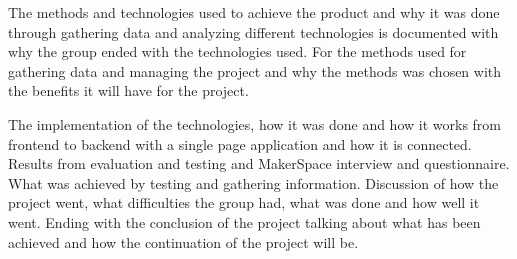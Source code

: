\documentclass[12pt]{report}
\begin{document}
The methods and technologies used to achieve the product and why it was done through gathering data and analyzing different technologies is documented with why the group ended with the technologies used. For the methods used for gathering data and managing the project and why the methods was chosen with the benefits it will have for the project.  

The implementation of the technologies, how it was done and how  it works from frontend to backend with a single page application and how it is connected. 
Results from evaluation and testing and MakerSpace interview and questionnaire. What was achieved by testing and gathering information. Discussion of how the project went, what difficulties the group had, what was done and how well it went. Ending with the conclusion of the project talking about what has been achieved and how the continuation of the project will be.


\newpage

\tableofcontents

\newpage














\printbibliography


\end{document}
